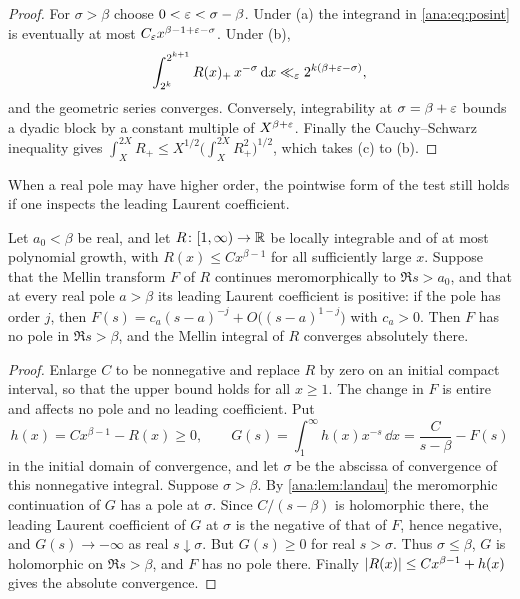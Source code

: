 \begin{proof}
For $\sigma>\beta$ choose $0<\varepsilon<\sigma-\beta$. Under (a) the integrand in
\eqref{ana:eq:posint} is eventually at most $C_\varepsilon x^{\beta-1+\varepsilon-\sigma}$. Under (b),
\[
 \int_{2^k}^{2^{k+1}}R(x)_+\,x^{-\sigma}\,\mathrm{d} x\ll_\varepsilon2^{k(\beta+\varepsilon-\sigma)},
\]
and the geometric series converges. Conversely, integrability at $\sigma=\beta+\varepsilon$ bounds a
dyadic block by a constant multiple of $X^{\beta+\varepsilon}$. Finally the Cauchy--Schwarz inequality
gives $\int_X^{2X}R_+\le X^{1/2}\bigl(\int_X^{2X}R_+^2\bigr)^{1/2}$, which takes (c) to (b).
\end{proof}

When a real pole may have higher order, the pointwise form of the test still holds if one
inspects the leading Laurent coefficient.

\begin{proposition}\label{ana:prop:higher}
Let $a_0<\beta$ be real, and let $R\colon[1,\infty)\to\mathbb{R}$ be locally integrable and of at most
polynomial growth, with $R(x)\le Cx^{\beta-1}$ for all sufficiently large $x$. Suppose that the
Mellin transform $F$ of $R$ continues meromorphically to $\Re s>a_0$, and that at every real
pole $a>\beta$ its leading Laurent coefficient is positive: if the pole has order $j$, then
$F(s)=c_a(s-a)^{-j}+O\bigl((s-a)^{1-j}\bigr)$ with $c_a>0$. Then $F$ has no pole in
$\Re s>\beta$, and the Mellin integral of $R$ converges absolutely there.
\end{proposition}

\begin{proof}
Enlarge $C$ to be nonnegative and replace $R$ by zero on an initial compact interval, so that
the upper bound holds for all $x\ge1$. The change in $F$ is entire and affects no pole and no
leading coefficient. Put
\[
 h(x)=Cx^{\beta-1}-R(x)\ge0,\qquad
 G(s)=\int_1^\infty h(x)x^{-s}\,\dd x=\frac{C}{s-\beta}-F(s)
\]
in the initial domain of convergence, and let $\sigma$ be the abscissa of convergence of this
nonnegative integral. Suppose $\sigma>\beta$. By \cref{ana:lem:landau} the meromorphic
continuation of $G$ has a pole at $\sigma$. Since $C/(s-\beta)$ is holomorphic there, the
leading Laurent coefficient of $G$ at $\sigma$ is the negative of that of $F$, hence negative,
and $G(s)\to-\infty$ as real $s\downarrow\sigma$. But $G(s)\ge0$ for real $s>\sigma$. Thus
$\sigma\le\beta$, $G$ is holomorphic on $\Re s>\beta$, and $F$ has no pole there. Finally
$\lvert R(x)\rvert\le Cx^{\beta-1}+h(x)$ gives the absolute convergence.
\end{proof}

